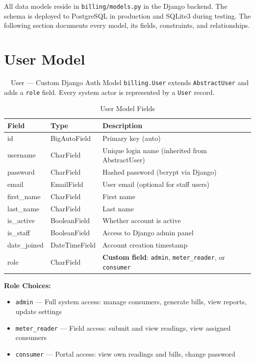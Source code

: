 \documentclass[12pt, a4paper]{report}
\newenvironment{featurelist}{%
    \begin{itemize}[leftmargin=1.5em, itemsep=2pt, parsep=0pt]
}{%
    \end{itemize}
}
\begin{document}
All data models reside in \texttt{billing/models.py} in the Django backend. The schema is deployed to PostgreSQL in production and SQLite3 during testing. The following section documents every model, its fields, constraints, and relationships.

\section{User Model}

\begin{actorbox}{\faUser\ \ User — Custom Django Auth Model}
\texttt{billing.User} extends \texttt{AbstractUser} and adds a \texttt{role} field. Every system actor is represented by a \texttt{User} record.
\end{actorbox}

\begin{table}[H]
\centering
\caption{User Model Fields}
\begin{tabularx}{\textwidth}{>{\ttfamily}l l X}
\toprule
\textbf{Field} & \textbf{Type} & \textbf{Description} \\
\midrule
id & BigAutoField & Primary key (auto) \\
username & CharField & Unique login name (inherited from AbstractUser) \\
password & CharField & Hashed password (bcrypt via Django) \\
email & EmailField & User email (optional for staff users) \\
first\_name & CharField & First name \\
last\_name & CharField & Last name \\
is\_active & BooleanField & Whether account is active \\
is\_staff & BooleanField & Access to Django admin panel \\
date\_joined & DateTimeField & Account creation timestamp \\
role & CharField & \textbf{Custom field}: \texttt{admin}, \texttt{meter\_reader}, or \texttt{consumer} \\
\bottomrule
\end{tabularx}
\end{table}

\textbf{Role Choices:}
\begin{featurelist}
    \item \texttt{admin} — Full system access: manage consumers, generate bills, view reports, update settings
    \item \texttt{meter\_reader} — Field access: submit and view readings, view assigned consumers
    \item \texttt{consumer} — Portal access: view own readings and bills, change password
\end{featurelist}
\end{document}
